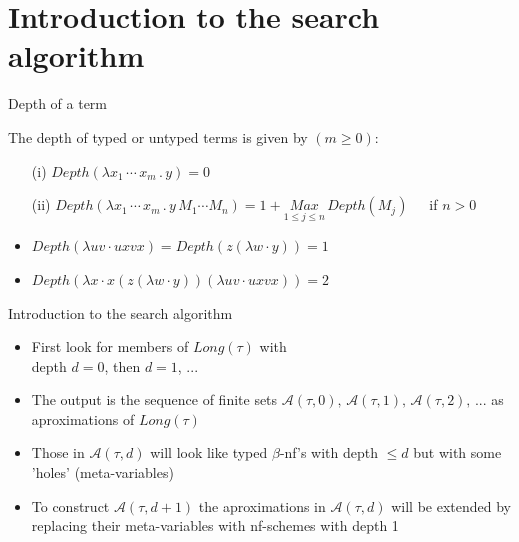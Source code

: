 \section{Introduction to the search algorithm}

\begin{frame}{Depth of a term}
\begin{mydef}
 The depth of typed or untyped terms is given by $(m \geq 0)$:
 
 \begin{itemize}
     \item[(i)] $Depth(\lambda x_1\, \cdots \, x_m\, . \, y) = 0$
      \item[(ii)] $Depth(\lambda x_1\, \cdots \, x_m\, . \, y \,M_1 \cdots M_n) = 1+ \underset{1 \leq j \leq n}{Max}\,Depth(M_j)\,\,\,\,\,\,\,$ if $n > 0$
  \end{itemize}
\end{mydef}

\begin{exa}
 \begin{itemize}
  \item $Depth(\lambda u v \cdot u x v x) = Depth(z(\lambda w \cdot y)) = 1$
  \item $Depth(\lambda x \cdot x(z(\lambda w \cdot y))(\lambda u v \cdot u x v x)) = 2$
 \end{itemize}
\end{exa}

\end{frame}

\begin{frame}{Introduction to the search algorithm}
 
 \begin{itemize}
  \item First look for members of $Long(\tau)$ with\\ 
   depth $d = 0$, then $d = 1$, ...\\[0.3 cm]
  \item The output is the sequence  of finite sets $\mathcal{A}(\tau,0),\,\mathcal{A}(\tau,1),\,\mathcal{A}(\tau,2),\,...$ as aproximations of $Long(\tau)$\\[0.3 cm]
  \item Those in $\mathcal{A}(\tau,d)$ will look like typed $\beta$-nf's with depth $\leq d$ but with some 'holes' (meta-variables)\\[0.3 cm]
  \item To construct $\mathcal{A}(\tau,d+1)$ the aproximations in $\mathcal{A}(\tau,d)$ will be extended by replacing their meta-variables with nf-schemes with depth 1
 \end{itemize}

 
\end{frame}

